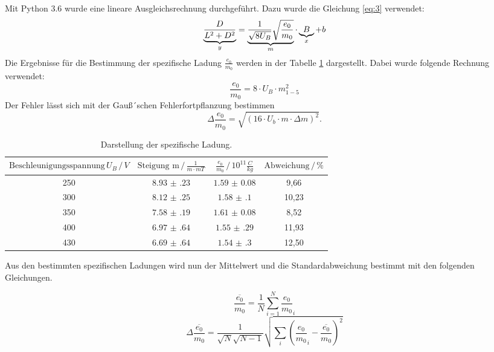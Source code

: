 Mit Python 3.6 wurde eine lineare Ausgleichsrechnung durchgeführt.
Dazu wurde die Gleichung \ref{eq:3} verwendet:
\begin{equation*}
  \underbrace{\frac{D}{L^2+D^2}}_{\mathclap{y}} = \underbrace{\frac{1}{\sqrt{8U_B}} \sqrt{\frac{e_0}{m_0}}}_{\mathclap{m}} \cdot \underbrace{B}_{\mathclap{x}} + b
\end{equation*}
Die Ergebnisse für die Bestimmung der spezifische Ladung $\frac{e_0}{m_0}$ werden
in der Tabelle \ref{tab:6} dargestellt. Dabei wurde folgende Rechnung verwendet:
\begin{equation*}
  \frac{e_0}{m_0} = 8 \cdot U_B \cdot m_{1-5}^2
\end{equation*}
Der Fehler lässt sich mit der Gauß´schen Fehlerfortpflanzung bestimmen
\begin{equation*}
  \Delta \frac{e_0}{m_0} = \sqrt{(16 \cdot U_b \cdot m \cdot \Delta m)^2}.
\end{equation*}


\begin{table}[H]
  \centering
  \caption{Darstellung der spezifische Ladung.}
  \label{tab:6}
  \begin{tabular}{c c c c}
\toprule
$\text{Beschleunigungsspannung}\, U_B \,/\, V$ & $\text{Steigung m} \,/\, \frac{1}{m\cdot mT}$ &$\frac{e_0}{m_0} \,/\, 10^{11}\frac{C}{kg}$ & $\text{Abweichung} \,/\, \%$\\
\midrule
250 &$\num{8.93(23)}$ &$\num{1.59(8)}$ &  9,66\\
300 &$\num{8.12(25)}$ &$\num{1.58(10)}$& 10,23\\
350 &$\num{7.58(19)}$ &$\num{1.61(8)}$ &  8,52\\
400 &$\num{6.97(64)}$ &$\num{1.55(29)}$& 11,93\\
430 &$\num{6.69(64)}$ &$\num{1.54(30)}$& 12,50\\
\bottomrule
  \end{tabular}
\end{table}

Aus den bestimmten spezifischen Ladungen wird nun der Mittelwert und die Standardabweichung
bestimmt mit den folgenden Gleichungen.

\begin{equation*}
  \overline{\frac{e_0}{m_0}}= \frac{1}{N} \sum_{i=1}^{N} \frac{e_0}{m_0}_{i}
\end{equation*}
\begin{equation*}
\Delta \overline{\frac{e_0}{m_0}} = \frac{1}{\sqrt{N}\sqrt{N-1}} \sqrt{\sum_{i}\left(\frac{e_0}{m_0}_{i}-\overline{\frac{e_0}{m_0}}\right)^2}
\end{equation*}

